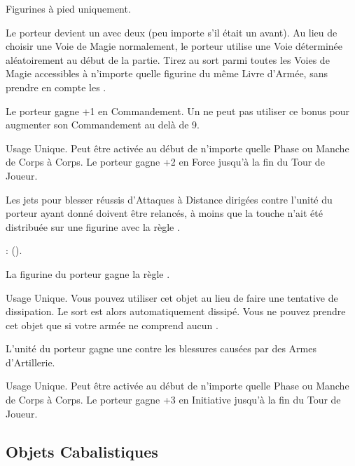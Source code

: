 \startpricelist

Figurines à pied uniquement.

Le porteur devient un \wizardapprentice{} avec deux \learnedspells{} (peu importe s'il était un \wizard{} avant). Au lieu de choisir une Voie de Magie normalement, le porteur utilise une Voie déterminée aléatoirement au début de la partie. Tirez au sort parmi toutes les Voies de Magie accessibles à n'importe quelle figurine du même Livre d'Armée, sans prendre en compte les \boundspells{}.

Le porteur gagne +1 en Commandement. Un \wizard{} ne peut pas utiliser ce bonus pour augmenter son Commandement au delà de 9.

Usage Unique. Peut être activée au début de n'importe quelle Phase ou Manche de Corps à Corps. Le porteur gagne +2 en Force jusqu'à la fin du Tour de Joueur.

Les jets pour blesser réussis d'Attaques à Distance dirigées contre l'unité du porteur ayant donné  doivent être relancés, à moins que la touche n'ait été distribuée sur une figurine avec la règle \toweringpresence{}.

\columnbreak

 : \pyromancyspellone{} (\pyromancy{}).

La figurine du porteur gagne la règle \divineattacks{}.

Usage Unique. Vous pouvez utiliser cet objet au lieu de faire une tentative de dissipation. Le sort est alors automatiquement dissipé. Vous ne pouvez prendre cet objet que si votre armée ne comprend aucun \wizard{}.

L'unité du porteur gagne une  contre les blessures causées par des Armes d'Artillerie.

Usage Unique. Peut être activée au début de n'importe quelle Phase ou Manche de Corps à Corps. Le porteur gagne +3 en Initiative jusqu'à la fin du Tour de Joueur.

\endpricelist

\newpage
\hypertarget{arcaneitems}{\subsection{Objets Cabalistiques}}
\label{arcane_items}


